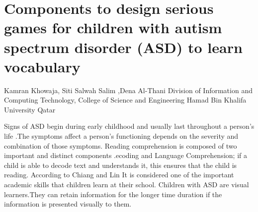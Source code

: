 \section{Components to design serious games for children with autism spectrum disorder (ASD) to learn vocabulary}

Kamran Khowaja, Siti Salwah Salim ,Dena Al-Thani Division of Information and Computing Technology, College of Science and Engineering Hamad Bin Khalifa University Qatar

Signs of ASD begin during early childhood and usually last throughout a person’s life .The symptoms affect a person’s functioning depends on the severity and combination of those symptoms. Reading comprehension is composed of two important and distinct components .ecoding and Language Comprehension; if a child is able to decode text and understands it, this ensures that the child is reading. According to Chiang and Lin It is considered one of the important academic skills that children learn at their school. Children with ASD are visual learners.They can retain information for the longer time duration if the information is presented visually to them.\\


